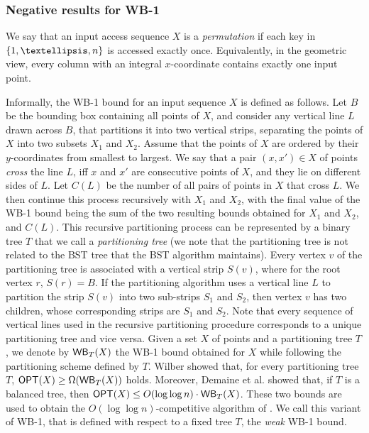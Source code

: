 \documentclass[11pt]{article}
\numberwithin{equation}{section}
\theoremstyle{definition}
\theoremstyle{plain}
\begin{document}
\subsubsection{Negative results for WB-1}

We say that an input access sequence $X$ is a \emph{permutation} if each key in $\set{1,\ldots,n}$ is accessed exactly
once. Equivalently, in the geometric view, every column with an integral $x$-coordinate contains exactly one input point.

Informally, the WB-1 bound for an input sequence $X$ is defined as follows. Let $B$ be the bounding box containing all points of $X$, and consider any vertical line $L$ drawn across $B$, that partitions it into two vertical strips, separating the points of $X$ into two subsets $X_{1}$
and $X_{2}$. Assume that the points of $X$ are ordered by their $y$-coordinates from smallest to largest. We say that a pair $(x,x')\in X$ of points \emph{cross} the line $L$, iff $x$ and $x'$ are consecutive points of $X$, and they lie on different sides of $L$. Let $C(L)$ be the number of all pairs of points in $X$ that cross $L$. We then continue this process recursively with $X_1$ and $X_2$, with the final value of the WB-1 bound being the sum of the two resulting bounds obtained for $X_1$ and $X_2$, and $C(L)$.
This recursive partitioning process can be represented by a binary tree $T$ that
we call a \emph{partitioning tree} (we note that the partitioning tree is not related to the BST tree that the BST algorithm maintains). 
Every vertex $v$ of the partitioning tree is associated with a vertical strip $S(v)$, where for the root vertex $r$, $S(r)=B$. If the partitioning algorithm uses a vertical line $L$ to partition the strip $S(v)$ into two sub-strips $S_1$ and $S_2$, then vertex $v$ has two children, whose corresponding strips are $S_1$ and $S_2$. Note that every sequence of vertical lines used in the recursive partitioning procedure corresponds to a unique partitioning tree and vice versa. 
Given a set  $X$ of points and a partitioning tree $T$, we denote  by $\mathsf{WB}_{T}(X)$ the WB-1 bound obtained for $X$ while following the partitioning scheme defined by $T$. Wilber \cite{wilber}
showed that, for every partitioning tree $T$, $\mbox{\sf OPT}(X)\geq \Omega(\mathsf{WB}_{T}(X))$ holds. Moreover,  Demaine et al. \cite{tango} showed that, if $T$ is a balanced tree, then $\mbox{\sf OPT}(X)\le O(\log\log n)\cdot \mathsf{WB}_{T}(X)$. These two bounds are used to obtain the $O(\log\log n)$-competitive algorithm of \cite{tango}. We call this variant of WB-1, that is defined with respect to a fixed tree $T$, the \emph{weak} WB-1 bound. 
\end{document}
